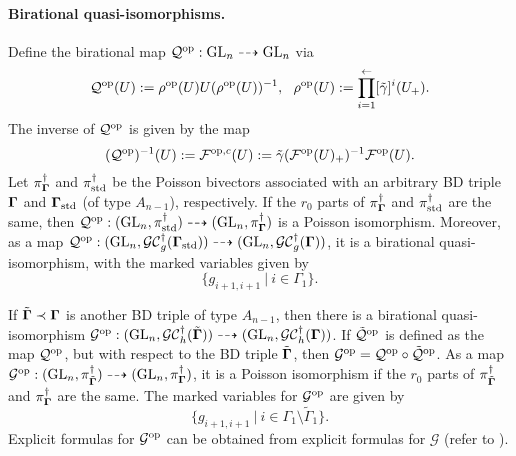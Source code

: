 \paragraph{Birational quasi-isomorphisms.} Define the birational map $\mathcal{Q}^{\mathrm{op}}:\operatorname{GL}_n \dashrightarrow \operatorname{GL}_n$ via
\begin{equation}
    \mathcal{Q}^{\op}(U):= \rho^{\op}(U) U (\rho^{\op}(U))^{-1}, \ \ \rho^{\op}(U):=\prod_{i=1}^{\leftarrow}[\tilde{\gamma}]^{i}(U_+).
\end{equation}
The inverse of $\mathcal{Q}^{\mathrm{op}}$ is given by the map
\begin{equation}
    (\mathcal{Q}^{\mathrm{op}})^{-1}(U):=\mathcal{F}^{\mathrm{op},c}(U):= \tilde{\gamma}(\mathcal{F}^{\mathrm{op}}(U)_+)^{-1}\mathcal{F}^{\mathrm{op}}(U).
\end{equation}
Let $\pi_{\mathbf{\Gamma}}^{\dagger}$ and $\pi_{\text{std}}^{\dagger}$ be the Poisson bivectors associated with an arbitrary BD triple $\mathbf{\Gamma}$ and $\mathbf{\Gamma}_{\text{std}}$ (of type $A_{n-1}$), respectively. If the $r_0$ parts of $\pi_{\mathbf{\Gamma}}^{\dagger}$ and $\pi_{\text{std}}^{\dagger}$ are the same, then $\mathcal{Q}^{\mathrm{op}}:(\operatorname{GL}_n,\pi_{\text{std}}^{\dagger}) \dashrightarrow (\operatorname{GL}_n,\pi_{\mathbf{\Gamma}}^{\dagger})$ is a Poisson isomorphism. Moreover, as a map $\mathcal{Q}^{\mathrm{op}}:(\operatorname{GL}_n,\mathcal{GC}_g^{\dagger}(\mathbf{\Gamma}_{\text{std}}))\dashrightarrow (\operatorname{GL}_n,\mathcal{GC}_g^{\dagger}(\mathbf{\Gamma}))$, it is a birational quasi-isomorphism, with the marked variables given by 
\begin{equation}
    \{g_{i+1,i+1} \ | \ i \in \Gamma_1\}.
\end{equation}

If $\tilde{\mathbf{\Gamma}}\prec \mathbf{\Gamma}$ is another BD triple of type $A_{n-1}$, then there is a birational quasi-isomorphism $\mathcal{G}^{\mathrm{op}}:(\operatorname{GL}_n,\mathcal{GC}_h^{\dagger}(\tilde{\mathbf{\Gamma}})) \dashrightarrow (\operatorname{GL}_n,\mathcal{GC}_h^{\dagger}(\mathbf{\Gamma}))$. If $\tilde{\mathcal{Q}}^{\mathrm{op}}$ is defined as the map $\mathcal{Q}^{\mathrm{op}}$, but with respect to the BD triple $\tilde{\mathbf{\Gamma}}$, then $\mathcal{G}^{\mathrm{op}} = \mathcal{Q}^{\mathrm{op}}\circ \tilde{\mathcal{Q}}^{\mathrm{op}}$. As a map $\mathcal{G}^{\mathrm{op}}:(\operatorname{GL}_n,\pi_{\tilde{\mathbf{\Gamma}}}^{\dagger})\dashrightarrow (\operatorname{GL}_n,\pi_{\mathbf{\Gamma}}^{\dagger})$, it is a Poisson isomorphism if the $r_0$ parts of $\pi_{\tilde{\mathbf{\Gamma}}}^{\dagger}$ and $\pi_{\mathbf{\Gamma}}^{\dagger}$ are the same. The marked variables for $\mathcal{G}^{\mathrm{op}}$ are given by
\begin{equation}
    \{g_{i+1,i+1} \ | \ i \in \Gamma_1\setminus \tilde{\Gamma}_1\}.
\end{equation}
Explicit formulas for $\mathcal{G}^{\mathrm{op}}$ can be obtained from explicit formulas for $\mathcal{G}$ (refer to \cite[Section 4.4, Section 4.5, Section 7.3]{multdual}).

